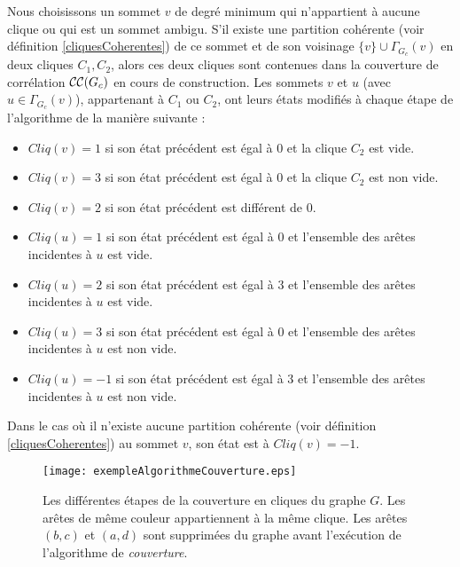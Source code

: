 Nous choisissons un sommet $v$ de degr\'e minimum qui n'appartient \`a aucune clique ou qui est un sommet ambigu. 
S'il existe une partition coh\'erente (voir d\'efinition \ref{cliquesCoherentes}) de ce sommet et de son voisinage $\{v\} \cup \Gamma_{G_c}(v)$ en deux cliques $C_1, C_2$, alors ces deux cliques sont contenues dans la couverture de corr\'elation ${\cal CC}(G_c)$ en cours de construction. Les sommets $v$ et $u$ (avec $u \in  \Gamma_{G_c}(v)$), appartenant \`a $C_1$ ou $C_2$, ont leurs \'etats modifi\'es \`a chaque \'etape de l'algorithme de la mani\`ere suivante :
\begin{itemize}
\item $Cliq(v) = 1$ si son \'etat pr\'ec\'edent est \'egal \`a $0$ et la clique $C_2$ est vide. 
\item $Cliq(v) = 3$ si son \'etat pr\'ec\'edent est \'egal \`a $0$ et la clique $C_2$ est non vide. 
\item $Cliq(v) = 2$ si son \'etat pr\'ec\'edent est diff\'erent de $0$.
\item $Cliq(u) = 1$ si son \'etat pr\'ec\'edent est \'egal \`a $0$ et l'ensemble des ar\^etes incidentes \`a $u$ est vide.
\item $Cliq(u) = 2$ si son \'etat pr\'ec\'edent est \'egal \`a $3$ et l'ensemble des ar\^etes incidentes \`a $u$ est vide.
\item $Cliq(u) = 3$ si son \'etat pr\'ec\'edent est \'egal \`a $0$ et l'ensemble des ar\^etes incidentes \`a $u$ est non vide.
\item $Cliq(u) = -1$ si son \'etat pr\'ec\'edent est \'egal \`a $3$ et l'ensemble des ar\^etes incidentes \`a $u$ est non vide.
\end{itemize} 
Dans le cas o\`u il n'existe aucune partition coh\'erente (voir d\'efinition \ref{cliquesCoherentes}) au sommet $v$, son \'etat est \`a $Cliq(v)=-1$.
\newline
\begin{figure}[htb!]
	\centering
	\texttt{[image: exempleAlgorithmeCouverture.eps]}\vspace{-0.5em}
	\caption{ Les diff\'erentes \'etapes de la couverture en cliques du graphe $G$. Les ar\^etes de m\^eme couleur appartiennent \`a la m\^eme clique.  Les ar\^etes $(b,c)$ et $(a,d)$ sont supprim\'ees du graphe avant l'ex\'ecution de l'algorithme de {\em couverture}.  }\vspace{-0.5em}
	\label{exempleAlgorithmeCouverture}
\end{figure}

